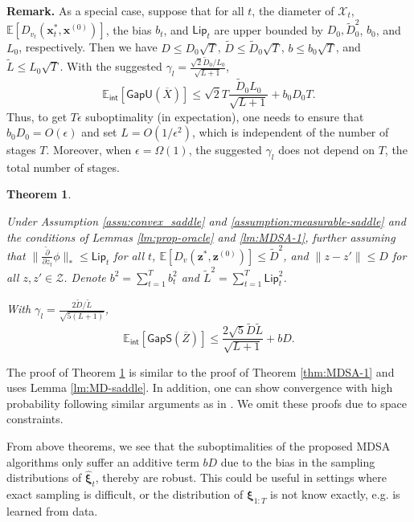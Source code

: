 \documentclass[11pt,fullpage,letterpaper]{article}
\newcommand{\mc}{\mathcal}
\newcommand{\mb}{\mathbf}
\newcommand{\E}{\mathbb{E}}
\newcommand{\bx}{\boldsymbol{\xi}}
\newcommand{\internal}{\mathsf{int}}
\newcommand{\gaps}{\mathsf{GapS}}
\newcommand{\gapu}{\mathsf{GapU}}
\newcommand{\lips}{\mathsf{Lip}}
\newtheorem{theorem}{Theorem}[section]
\begin{document}
\textbf{Remark.} As a special case, suppose that for all $t$, the diameter of $\mc X_t$, $\E[D_{v_t}(\mb x_t^*,\mb x^{(0)})]$, the bias $b_t$, and $\lips_t$ are upper bounded by $D_0, \tilde{D}^2_0$, $b_0$, and $L_0$, respectively. Then we have ${D} \leq {D}_0\sqrt{T}$, $\tilde{D} \leq \tilde{D}_0\sqrt{T}$, ${b} \leq b_0\sqrt{T}$, and $\tilde{L} \leq  L_0\sqrt{T}$. With the suggested $\gamma_l = \frac{\sqrt{2}\tilde{D}_0/L_0}{\sqrt{L+1}}$,
\begin{displaymath}
    \E_{\internal}[\gapu(\overline{X})]\leq \sqrt{2}T\frac{\tilde{D}_0L_0}{\sqrt{L+1}}+b_0D_0T.
\end{displaymath}
Thus, to get $T\epsilon$ suboptimality (in expectation), one needs to ensure that $b_0D_0=O( \epsilon )$ and set $L = O(1/\epsilon^2)$, which is independent of the number of stages $T$. Moreover, when $\epsilon=\Omega(1)$, the suggested $\gamma_l$ does not depend on $T$, the total number of stages. 



\begin{theorem}\label{thm:MDSA-2}


Under Assumption \ref{assu:convex_saddle} and \ref{assumption:measurable-saddle} and the conditions of Lemmas \ref{lm:prop-oracle} and \ref{lm:MDSA-1}, further assuming that $\|\frac{\tilde{\partial}}{\partial z_t} \phi\|_*\leq \lips_t$ for all $t$, $\E[D_v(\mb z^*,\mb z^{(0)})]\leq \tilde{D}^2$, and $\|z-z'\|\leq D$ for all $z,z'\in \mc Z$. Denote $b^2 = \sum_{t=1}^T b_t^2$ and $\tilde{L}^2 = \sum_{t=1}^T \lips_t^2$. 

With $\gamma_l = \frac{2\tilde{D}/\tilde{L}}{\sqrt{5(L+1)}}$,
\begin{equation}\label{eq:convergence-in-exp-saddle}
\E_{\internal}[\gaps(\overline{Z})] \leq \frac{2\sqrt{5}\tilde{D}\tilde{L}}{\sqrt{L+1}}+bD.
\end{equation}
\end{theorem}

The proof of Theorem \ref{thm:MDSA-2} is similar to the proof of Theorem \ref{thm:MDSA-1} and uses Lemma \ref{lm:MD-saddle}. In addition, one can show convergence with high probability following similar arguments as in \cite{NemirovskiRobustSA2009}. We omit these proofs due to space constraints. 

From above theorems, we see that the suboptimalities of the proposed MDSA algorithms only suffer an additive term $bD$ due to the bias in the sampling distributions of $\widehat{\bx}_t$, thereby are robust. This could be useful in settings where exact sampling is difficult, or the distribution of $\bx_{1:T}$ is not know exactly, e.g. is learned from data. 
\end{document}
